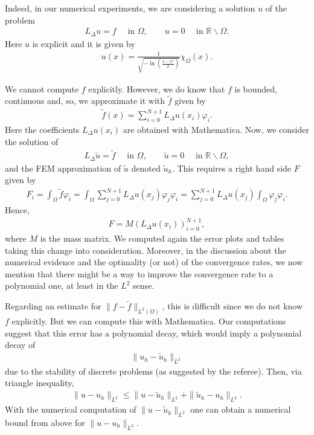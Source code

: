 \documentclass[11 pt]{article}
\numberwithin{equation}{section}
\def\r{\mathbb{R}}
\def\tilde{\widetilde}
\begin{document}
\begin{enumerate}
\begin{itemize}
Indeed, in our numerical experiments, we are considering a solution $u$ of the problem
        \begin{align*}
         L_\Delta u = f\quad \text{ in }\Omega,\qquad u=0\quad \text{ in }\r\backslash \Omega.
        \end{align*}
        Here $u$ is explicit and it is given by
        \begin{align}\label{udef}
 u(x)=\frac{1}{\sqrt{-\ln\left(\frac{1-x^2}{2}\right)}} \chi_{\Omega}(x).
\end{align}

We cannot compute $f$ explicitly.  However, we do know that $f$ is bounded, continuous and, so, we approximate it with $\widetilde f$ given by
\begin{align*}
 \widetilde f (x) = \sum_{i=0}^{N+1} L_\Delta u(x_i)\varphi_i.
 \end{align*}
Here the coefficients $L_\Delta u(x_i)$ are obtained with Mathematica. Now, we consider the solution of
\begin{align*}
         L_\Delta \widetilde u = \widetilde f\quad \text{ in }\Omega,\qquad \widetilde u=0\quad \text{ in }\r\backslash \Omega,
        \end{align*}
and the FEM approximation of $\widetilde u$ denoted $\widetilde u_h$. This requires a right hand side $F$ given by
\begin{align*}
 F_i
 =\int_{\Omega} \widetilde f \varphi_i
 = \int_{\Omega} \sum_{j=0}^{N+1} L_\Delta u(x_j)\varphi_j \varphi_i
 =\sum_{j=0}^{N+1} L_\Delta u(x_j) \int_{\Omega} \varphi_j \varphi_i.
 \end{align*}
Hence,
\begin{align*}
 F = M  (L_\Delta u(x_i))_{i=0}^{N+1},
\end{align*}
where $M$ is the mass matrix.  We computed again the error plots and tables taking this change into consideration. Moreover, in the discussion about the numerical evidence and the optimality (or not) of the convergence rates, we now mention that there might be a way to improve the convergence rate to a polynomial one, at least in the $L^2$ sense.

Regarding an estimate for \(\|f-\tilde{f}\|_{L^{2}(\Omega)}\), this is difficult since we do not know $f$ explicitly. But we can compute this with Mathematica.  Our computations suggest that this error has a polynomial decay, which would imply a polynomial decay of
\begin{align*}
\|u_{h}-\widetilde u_{h}\|_{L^2}
\end{align*}
due to the stability of discrete problems (as suggested by the referee).  Then, via triangle inequality,
\begin{align*}
 \|u-u_h\|_{L^2}
 \leq \|u-\widetilde u_h\|_{L^2}+\|\widetilde u_h-u_h\|_{L^2}.
\end{align*}
With the numerical computation of $\|u-\widetilde u_h\|_{L^2}$ one can obtain a numerical bound from above for $\|u-u_h\|_{L^2}$.


\end{itemize}
\end{enumerate}
\end{document}
